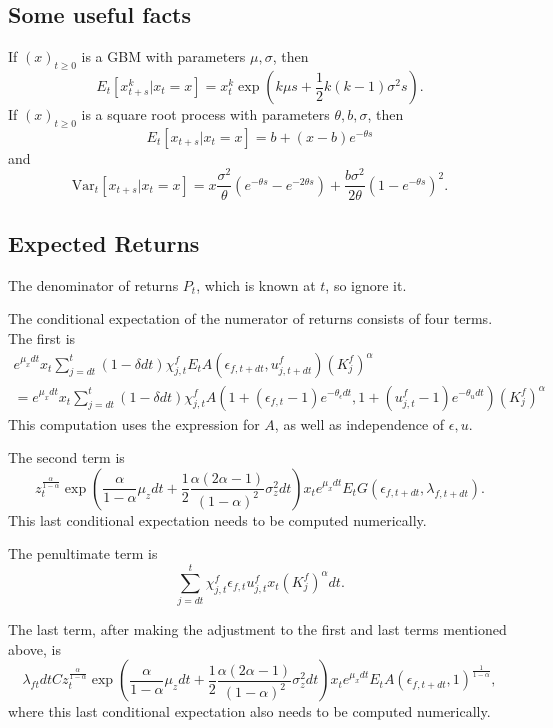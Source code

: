 \subsection{Some useful facts}

If $(x)_{t \geq 0}$ is a GBM with parameters $\mu, \sigma$, then \[
E_t[x_{t+s}^k|x_t = x] = x_t^k \exp \left(k \mu s + \frac{1}{2} k(k-1) \sigma^2 s\right).
\]
If $(x)_{t \geq 0}$ is a square root process with parameters $\theta, b, \sigma$, then \[
E_t[x_{t+s}|x_t = x] = b + (x-b) e^{- \theta s}
\]
and \[
\text{Var}_t[x_{t+s}| x_t = x] = x \frac{\sigma^2}{\theta} (e^{- \theta s} - e^{-2 \theta s}) + \frac{b \sigma^2}{2\theta} (1 - e^{- \theta s})^2.
\]
\subsection{Expected Returns}

The denominator of returns $P_t$, which is known at $t$, so ignore it.

The conditional expectation of the numerator of returns consists of four terms. The first is 
\begin{multline*}
e^{\mu_x dt} x_t \sum_{j = dt}^t (1 - \delta dt) \chi_{j, t}^f E_t A(\epsilon_{f, t+dt}, u_{j, t+dt}^f) (K_j^f)^{\alpha} \\
= e^{\mu_x dt} x_t \sum_{j = dt}^t (1 - \delta dt) \chi_{j, t}^f A(1 + (\epsilon_{f, t} - 1) e^{-\theta_{\epsilon} dt} , 1 + (u_{j, t}^f - 1) e^{-\theta_{u} dt}) (K_j^f)^{\alpha}
\end{multline*}
This computation uses the expression for $A$, as well as independence of $\epsilon, u$.

The second term is \[
z_t^{\frac{\alpha}{1 - \alpha}} \exp \left( \frac{\alpha}{1 - \alpha}\mu_z dt + \frac{1}{2} \frac{\alpha(2 \alpha - 1)}{(1 - \alpha)^2}\sigma_z^2 dt\right) x_t e^{\mu_x dt} E_t G(\epsilon_{f, t+dt}, \lambda_{f, t+dt}).
\]
This last conditional expectation needs to be computed numerically.

The penultimate term is \[
\sum_{j = dt}^t\chi_{j, t}^f \epsilon_{f,t} u_{j,t}^f x_{t} (K_j^f)^{\alpha} dt.
\]

The last term, after making the adjustment to the first and last terms mentioned above, is \[
\lambda_{f t} dt C z_t^{\frac{\alpha}{1 - \alpha}} \exp \left( \frac{\alpha}{1 - \alpha}\mu_z dt + \frac{1}{2} \frac{\alpha(2 \alpha - 1)}{(1 - \alpha)^2}\sigma_z^2 dt\right) x_t e^{\mu_x dt} E_t A(\epsilon_{f, t+dt}, 1)^{\frac{1}{1 - \alpha}},
\]
where this last conditional expectation also needs to be computed numerically.

